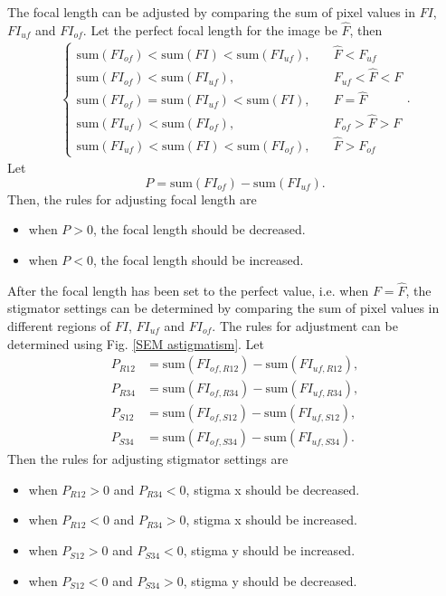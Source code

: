 \documentclass[conference]{IEEEtran}
\begin{document}
The focal length can be adjusted by comparing the sum of pixel values in $FI$, $FI_{uf}$ and $FI_{of}$. Let the perfect focal length for the image be $\hat{F}$, then
\begin{align*}
\begin{cases}
    \text{sum}(FI_{of}) < \text{sum}(FI) < \text{sum}(FI_{uf}), \quad & \hat{F} < F_{uf} \\
    \text{sum}(FI_{of}) < \text{sum}(FI_{uf}), \quad & F_{uf} < \hat{F} < F \\
    \text{sum}(FI_{of}) = \text{sum}(FI_{uf}) < \text{sum}(FI), \quad & F=\hat{F} \\
    \text{sum}(FI_{uf}) < \text{sum}(FI_{of}), \quad & F_{of} > \hat{F} > F \\
    \text{sum}(FI_{uf}) < \text{sum}(FI) < \text{sum}(FI_{of}), \quad & \hat{F} > F_{of}
\end{cases}.
\end{align*}
Let
\begin{equation}
    P = \text{sum}(FI_{of}) - \text{sum}(FI_{uf}).
\end{equation}
Then, the rules for adjusting focal length are
\begin{itemize}
    \item when $P>0$, the focal length should be decreased.
    \item when $P<0$, the focal length should be increased.
\end{itemize}

After the focal length has been set to the perfect value, i.e. when $F=\hat{F}$, the stigmator settings can be determined by comparing the sum of pixel values in different regions of $FI$, $FI_{uf}$ and $FI_{of}$. The rules for adjustment can be determined using Fig. \ref{SEM astigmatism}. Let
\begin{align}
    P_{R12} & = \text{sum}(FI_{of,R12}) - \text{sum}(FI_{uf,R12}), \\
    P_{R34} & = \text{sum}(FI_{of,R34}) - \text{sum}(FI_{uf,R34}), \\
    P_{S12} & = \text{sum}(FI_{of,S12}) - \text{sum}(FI_{uf,S12}), \\
    P_{S34} & = \text{sum}(FI_{of,S34}) - \text{sum}(FI_{uf,S34}).
\end{align}
Then the rules for adjusting stigmator settings are
\begin{itemize}
    \item when $P_{R12}>0$ and $P_{R34}<0$, stigma x should be decreased.
    \item when $P_{R12}<0$ and $P_{R34}>0$, stigma x should be increased.
    \item when $P_{S12}>0$ and $P_{S34}<0$, stigma y should be increased.
    \item when $P_{S12}<0$ and $P_{S34}>0$, stigma y should be decreased.
\end{itemize}
\end{document}
